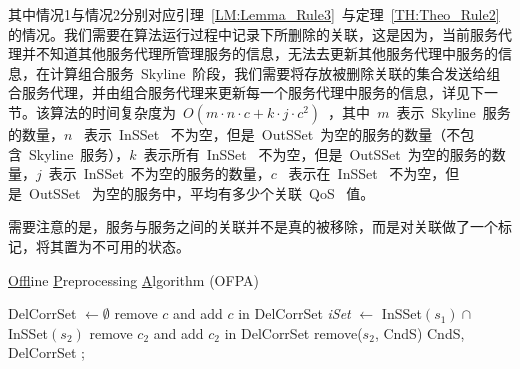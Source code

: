 其中情况1与情况2分别对应引理~\ref{LM:Lemma_Rule3}~与定理~\ref{TH:Theo_Rule2}~ 的情况。我们需要在算法运行过程中记录下所删除的关联，这是因为，当前服务代理并不知道其他服务代理所管理服务的信息，无法去更新其他服务代理中服务的信息，在计算组合服务~Skyline~阶段，我们需要将存放被删除关联的集合发送给组合服务代理，并由组合服务代理来更新每一个服务代理中服务的信息，详见下一节。该算法的时间复杂度为~$O(m \cdot n \cdot c + k \cdot j \cdot c^{2})$~，其中~$m$~表示~Skyline~服务的数量，$n$~ 表示~InSSet~ 不为空，但是~OutSSet~为空的服务的数量（不包含~Skyline~服务），$k$~表示所有~InSSet~ 不为空，但是~OutSSet~为空的服务的数量，$j$~表示~InSSet~不为空的服务的数量，$c$~ 表示在~InSSet~ 不为空，但是~OutSSet~ 为空的服务中，平均有多少个关联~QoS~ 值。

需要注意的是，服务与服务之间的关联并不是真的被移除，而是对关联做了一个标记，将其置为不可用的状态。

\begin{algorithm}[htbp]
\caption{\underline{Of}fline \underline{P}reprocessing \underline{A}lgorithm (OFPA)}
\label{A:Algo_1_OFPA}
    DelCorrSet $\leftarrow \emptyset$\;
    {
        {
            {
                {
                    remove $c$ and add $c$ in DelCorrSet\;
                }
            }
        }
        {
            \emph{iSet} $\leftarrow$ InSSet$(s_{1}) \cap$ InSSet$(s_{2})$\;
            {
                {
                    remove $c_{2}$ and add $c_{2}$ in DelCorrSet\;
                }
            }
        }
        {
            remove($s_{2}$, CndS)\;
        }
    }
    {
    \Return  CndS, DelCorrSet ;
    }
\end{algorithm}


